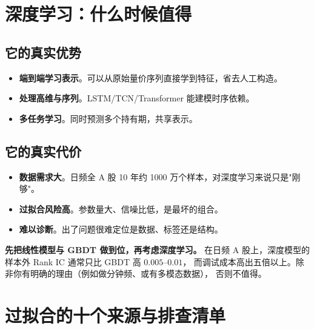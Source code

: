 \section{深度学习：什么时候值得}

\subsection{它的真实优势}

\begin{itemize}
  \item \textbf{端到端学习表示}。可以从原始量价序列直接学到特征，省去人工构造。
  \item \textbf{处理高维与序列}。LSTM/TCN/Transformer 能建模时序依赖。
  \item \textbf{多任务学习}。同时预测多个持有期，共享表示。
\end{itemize}

\subsection{它的真实代价}

\begin{itemize}
  \item \textbf{数据需求大}。日频全 A 股 10 年约 1000 万个样本，对深度学习来说只是"刚够"。
  \item \textbf{过拟合风险高}。参数量大、信噪比低，是最坏的组合。
  \item \textbf{难以诊断}。出了问题很难定位是数据、标签还是结构。
\end{itemize}

\begin{keybox}[本书的建议]
\textbf{先把线性模型与 GBDT 做到位，再考虑深度学习。}
在日频 A 股上，深度模型的样本外 Rank IC 通常只比 GBDT 高 $0.005$--$0.01$，
而调试成本高出五倍以上。除非你有明确的理由（例如做分钟频、或有多模态数据），
否则不值得。
\end{keybox}

\section{过拟合的十个来源与排查清单}

